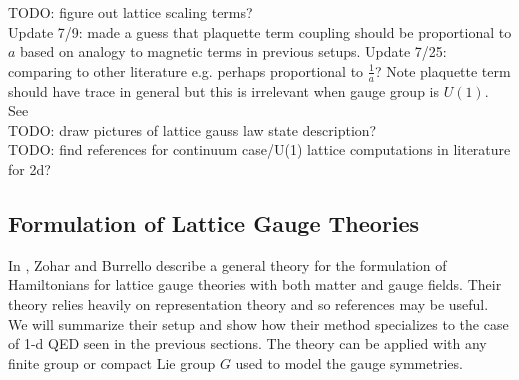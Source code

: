 \documentclass[11pt,reqno]{amsart}
\numberwithin{equation}{section}
\begin{document}
	TODO: figure out lattice scaling terms? \\
	\qquad Update 7/9: made a guess that plaquette term coupling should be proportional to $a$ based on analogy to magnetic terms in previous setups.
	Update 7/25: comparing to other literature e.g. \cite{KogutSusskind75} perhaps proportional to $\frac{1}{a}$? 
	Note plaquette term should have trace in general but this is irrelevant when gauge group is $U(1)$. See \cite{ZoharBurrello15}\\	
	
	TODO: draw pictures of lattice gauss law state description?\\
	
	TODO: find references for continuum case/U(1) lattice computations in literature for 2d?
	
	\subsection{Formulation of Lattice Gauge Theories}
	
	In \cite{ZoharBurrello15}, Zohar and Burrello describe a general theory for the formulation of Hamiltonians for lattice gauge theories with both matter and gauge fields. 
	Their theory relies heavily on representation theory and so references \cite{hall_lglarep,teleman_rep_theory} may be useful.
	We will summarize their setup and show how their method specializes to the case of 1-d QED seen in the previous sections.
	The theory can be applied with any finite group or compact Lie group $G$ used to model the gauge symmetries.
	
\end{document}
